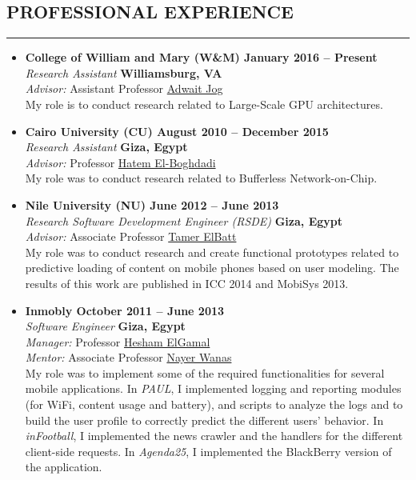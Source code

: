 \documentclass[10pt,a4]{article}
\begin{document}
\subsection*{PROFESSIONAL EXPERIENCE}
\hrule
\vspace{0.2cm}
\begin{itemize}

\item{\bf College of William and Mary (W\&M) \hfill {\bf January 2016 -- Present}}\\
{\it Research Assistant} \hfill {\bf Williamsburg, VA}\\
{\it Advisor:} Assistant Professor \href{http://www.cs.wm.edu/~adwait/}{Adwait Jog} \\
My role is to conduct research related to Large-Scale GPU architectures. 

\item{\bf Cairo University (CU) \hfill {\bf August 2010 -- December 2015}}\\
{\it Research Assistant} \hfill {\bf Giza, Egypt}\\
{\it Advisor:} Professor \href{http://scholar.cu.edu.eg/?q=helboghdadi}{Hatem El-Boghdadi}\\
My role was to conduct research related to Bufferless Network-on-Chip.

\item{\bf Nile University (NU) \hfill {\bf June 2012 -- June 2013}}\\
{\it Research Software Development Engineer (RSDE)} \hfill {\bf Giza, Egypt}\\
{\it Advisor:} Associate Professor \href{https://sites.google.com/site/telbatt/}{Tamer ElBatt}\\
My role was to conduct research and create functional prototypes related to predictive loading of content on mobile phones based on user modeling. The results of this work are published in ICC 2014 and MobiSys 2013. 

\item{\bf Inmobly \hfill {\bf October 2011 -- June 2013}}\\
{\it Software Engineer} \hfill {\bf Giza, Egypt}\\
{\it Manager:} Professor \href{https://ece.osu.edu/people/elgamal}{Hesham ElGamal}\\ 
{\it Mentor:} Associate Professor \href{https://eg.linkedin.com/in/nwanas}{Nayer Wanas}\\
My role was to implement some of the required functionalities for several mobile applications. In {\it PAUL}, I implemented logging and reporting modules (for Wi­Fi, content usage and battery), and scripts to analyze the logs and to build the user profile to correctly predict the different users' behavior. In {\it inFootball}, I implemented the news crawler and the handlers for the different client-side requests. In {\it Agenda25}, I implemented the BlackBerry version of the application.


\end{itemize}
\end{document}
